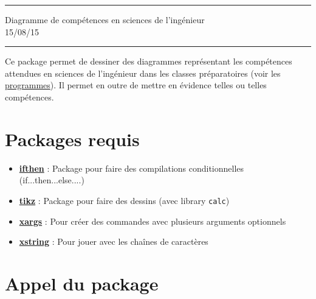 \documentclass[a4paper,12pt]{article}
\begin{document}
	\begin{center}
		\hrule{\Large Diagramme de compétences en sciences de l'ingénieur}\\15/08/15\\\hrule
	\end{center}


	
	Ce package permet de dessiner des diagrammes représentant les compétences attendues en sciences de l'ingénieur dans les classes préparatoires (voir les \href{http://www.enseignementsup-recherche.gouv.fr/pid20536/bulletin-officiel.html?cid_bo=71640&cbo=1}{programmes}).
	Il permet en outre de mettre en évidence telles ou telles compétences.
	
	\section{Packages requis}

		\begin{itemize}
			\item \href{http://www.ctan.org/pkg/ifthen}{\textbf{ifthen}} : Package pour faire des compilations conditionnelles (if...then...else....)
			\item \href{http://www.ctan.org/pkg/pgf}{\textbf{tikz}} : Package pour faire des dessins (avec library \verb!calc!)
			\item \href{http://www.ctan.org/pkg/xargs}{\textbf{xargs}} : Pour créer des commandes avec plusieurs arguments optionnels
			\item \href{https://www.ctan.org/pkg/xstring}{\textbf{xstring}} : Pour jouer avec les chaînes de caractères
		\end{itemize}
		
		
	\section{Appel du package}
\end{document}
